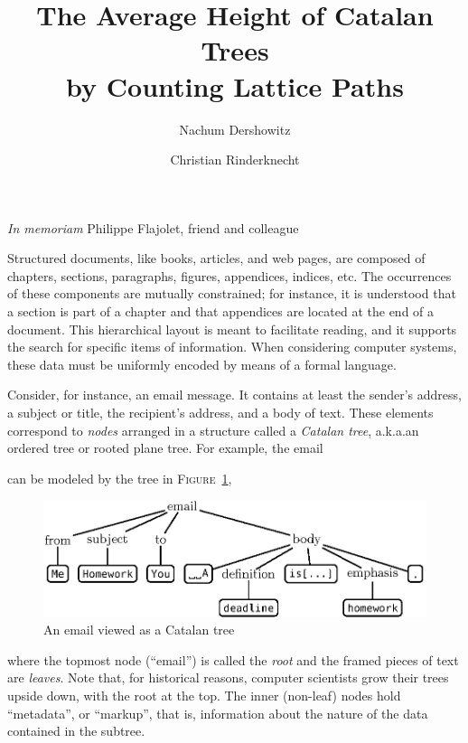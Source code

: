 \documentclass[11pt]{article}
\title{The Average Height of Catalan Trees\\
  by Counting Lattice Paths}
\author{Nachum Dershowitz \and Christian Rinderknecht}
\date{}
\newcommand\fig{\textsc{Figure}}
\begin{document}
\maketitle

\hfill \emph{In memoriam} Philippe Flajolet, friend and colleague

\bigskip

Structured documents, like books, articles, and web pages, are composed
of chapters, sections, paragraphs, figures, appendices, indices, etc.
The
occurrences of these components are mutually constrained; for instance, it is
understood that a section is part of a chapter and that appendices are
located at the end of a document. This hierarchical layout is meant to
facilitate reading, and it supports the search for specific items of
information. When considering computer systems, these data must be
uniformly encoded by means of a formal language. 

Consider, for instance, an email message.
It contains at least the sender's address, a subject or title, the
recipient's address, and a body of text. These elements
correspond to \emph{nodes} arranged in a structure called a \emph{Catalan
  tree}, a.k.a.\@ an ordered tree or rooted plane tree. For example, the email
\begin{center}
\end{center}
can be modeled by the tree in \fig~\ref{fig:mail},
\begin{figure}
\centering
\includegraphics[bb=71 620 389 723]{mail}
\caption{An email viewed as a Catalan tree\label{fig:mail}}
\end{figure}
where the topmost node (``email'') is called the \emph{root} and the
framed pieces of text are \emph{leaves}.
Note that, for historical reasons, computer scientists grow
their trees upside down, with the root at the top. The inner (non-leaf) nodes hold ``metadata'', or ``markup'',
that is, information about the nature of the data contained in the subtree.
\end{document}
